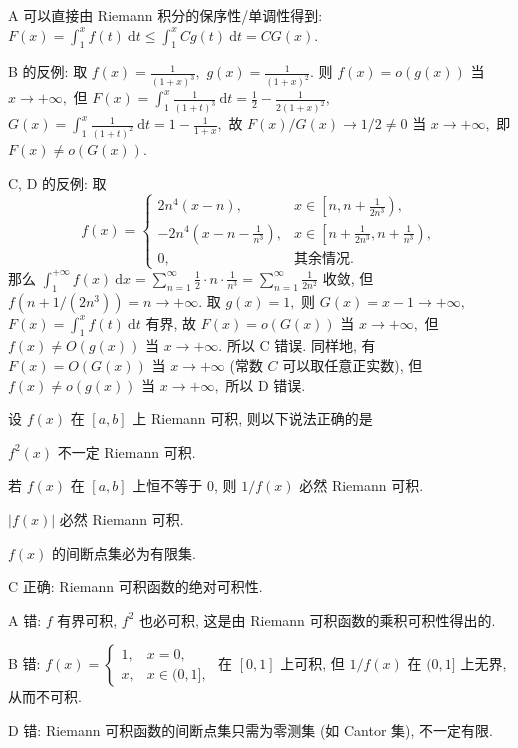 \begin{solution}
A 可以直接由 Riemann 积分的保序性/单调性得到: $F(x) = \int_1^x f(t) ~ \mathrm{d}t \leqslant \int_1^x C g(t) ~ \mathrm{d}t = C G(x).$

B 的反例: 取 $f(x) = \frac{1}{(1 + x)^3},$ $g(x) = \frac{1}{(1 + x)^2}.$ 则 $f(x) = o(g(x))$ 当 $x \to +\infty,$ 但 $F(x) = \int_1^x \frac{1}{(1+t)^3} ~ \mathrm{d}t = \frac{1}{2} - \frac{1}{2(1+x)^2},$ $G(x) = \int_1^x \frac{1}{(1+t)^2} ~ \mathrm{d}t = 1 - \frac{1}{1+x},$ 故 $F(x)/G(x) \to 1/2 \neq 0$ 当 $x \to +\infty,$ 即 $F(x) \neq o(G(x)).$

C, D 的反例: 取
\[
f(x) = \begin{cases}
2n^4 (x - n), & x \in \left[n, n + \frac{1}{2n^3}\right), \\[6pt]
-2n^4 \left(x - n - \frac{1}{n^3}\right), & x \in \left[n + \frac{1}{2n^3}, n + \frac{1}{n^3}\right), \\[6pt]
0, & \text{其余情况}.
\end{cases}
\]
那么 $\int_1^{+\infty} f(x) ~ \mathrm{d}x = \sum_{n=1}^\infty \frac{1}{2} \cdot n \cdot \frac{1}{n^3} = \sum_{n=1}^\infty \frac{1}{2n^2}$ 收敛, 但 $f(n + 1/(2n^3)) = n \to +\infty.$ 取 $g(x) = 1,$ 则 $G(x) = x - 1 \to +\infty,$ $F(x) = \int_1^x f(t) ~ \mathrm{d}t$ 有界, 故 $F(x) = o(G(x))$ 当 $x \to +\infty,$ 但 $f(x) \neq O(g(x))$ 当 $x \to +\infty.$ 所以 C 错误. 同样地, 有 $F(x) = O(G(x))$ 当 $x \to +\infty$ (常数 $C$ 可以取任意正实数), 但 $f(x) \neq o(g(x))$ 当 $x \to +\infty,$ 所以 D 错误.
\end{solution}




\begin{question}
设 $f(x)$ 在 $[a, b]$ 上 Riemann 可积, 则以下说法正确的是 \paren[C]

\begin{choices}
\item $f^2(x)$ 不一定 Riemann 可积.
\item 若 $f(x)$ 在 $[a, b]$ 上恒不等于 0, 则 $1/f(x)$ 必然 Riemann 可积.
\item $|f(x)|$ 必然 Riemann 可积.
\item $f(x)$ 的间断点集必为有限集.
\end{choices}
\end{question}

\begin{solution}
C 正确: Riemann 可积函数的绝对可积性.

A 错: $f$ 有界可积, $f^2$ 也必可积, 这是由 Riemann 可积函数的乘积可积性得出的.

B 错: $f(x) = \begin{cases} 1, & x = 0, \\ x, & x \in (0, 1], \end{cases}$ 在 $[0, 1]$ 上可积, 但 $1/f(x)$ 在 $(0, 1]$ 上无界, 从而不可积.

D 错: Riemann 可积函数的间断点集只需为零测集 (如 Cantor 集), 不一定有限.
\end{solution}

